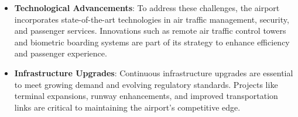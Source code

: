 \documentclass[
]{article}
\providecommand{\tightlist}{%
  \setlength{\itemsep}{0pt}\setlength{\parskip}{0pt}}\usepackage{longtable,booktabs,array}
\begin{document}
\begin{enumerate}
  \begin{itemize}
  \tightlist
  \item
    \textbf{Technological Advancements}: To address these challenges,
    the airport incorporates state-of-the-art technologies in air
    traffic management, security, and passenger services. Innovations
    such as remote air traffic control towers and biometric boarding
    systems are part of its strategy to enhance efficiency and passenger
    experience.
  \item
    \textbf{Infrastructure Upgrades}: Continuous infrastructure upgrades
    are essential to meet growing demand and evolving regulatory
    standards. Projects like terminal expansions, runway enhancements,
    and improved transportation links are critical to maintaining the
    airport's competitive edge.
  \end{itemize}
\end{enumerate}
\end{document}
